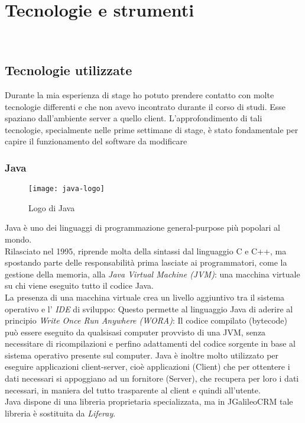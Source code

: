 
\chapter{Tecnologie e strumenti}
\label{cap:tecnologie-strumenti}

\\

\section{Tecnologie utilizzate}
Durante la mia esperienza di stage ho potuto prendere contatto con molte tecnologie differenti e che non avevo incontrato durante il corso di studi. Esse spaziano dall'ambiente server a quello client. L'approfondimento di tali tecnologie, specialmente nelle prime settimane di stage, è stato fondamentale per capire il funzionamento del software da modificare \\
\subsection{Java}
\begin{figure}[h]
	\centering
	\texttt{[image: java-logo]}
	\caption{Logo di Java}
\end{figure}
Java è uno dei linguaggi di programmazione general-purpose più popolari al mondo. \\
Rilasciato nel 1995, riprende molta della sintassi dal linguaggio C e C++, ma spostando parte delle responsabilità prima lasciate ai programmatori, come la gestione della memoria, alla \emph{Java Virtual Machine (JVM)}: una macchina virtuale su chi viene eseguito tutto il codice Java.\\
La presenza di una macchina virtuale crea un livello aggiuntivo tra il sistema operativo e l' \emph{IDE} di sviluppo: Questo permette al linguaggio Java di aderire al principio \emph{Write Once Run Anywhere (WORA)}: Il codice compilato (bytecode) può essere eseguito da qualsisasi computer provvisto di una JVM, senza necessitare di ricompilazioni e perfino adattamenti del codice sorgente in base al sistema operativo presente sul computer.
Java è inoltre molto utilizzato per eseguire applicazioni client-server, cioè applicazioni (Client) che per ottentere i dati necessari si appoggiano ad un fornitore (Server), che recupera per loro i dati necessari, in maniera del tutto trasparente al client e quindi all'utente.\\
Java dispone di una libreria proprietaria specializzata, ma in JGalileoCRM tale libreria è sostituita da \emph{Liferay}.\\ %
